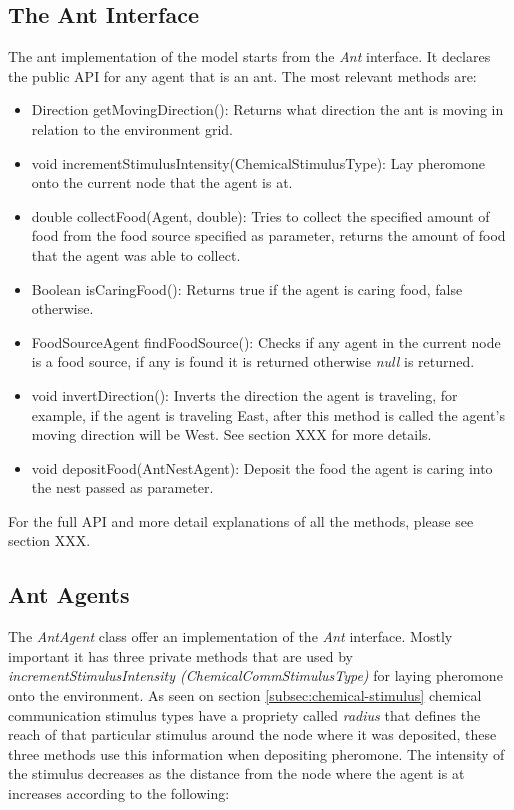 \subsection{The Ant Interface}

The ant implementation of the model starts from the \emph{Ant} interface. It declares the public API for any agent that is an ant. The most relevant methods are: 

\begin{itemize}
  \item Direction getMovingDirection(): Returns what direction the ant is moving in relation to the environment grid.
  \item void incrementStimulusIntensity(ChemicalStimulusType): Lay pheromone onto the current node that the agent is at.
  \item double collectFood(Agent, double): Tries to collect the specified amount of food from the food source specified as parameter, returns the amount of food that the agent was able to collect.
  \item Boolean isCaringFood(): Returns true if the agent is caring food, false otherwise.
  \item FoodSourceAgent findFoodSource(): Checks if any agent in the current node is a food source, if any is found it is returned otherwise \emph{null} is returned.
  \item void invertDirection(): Inverts the direction the agent is traveling, for example, if the agent is traveling East, after this method is called the agent’s moving direction will be West. See section XXX for more details.
  \item void depositFood(AntNestAgent): Deposit the food the agent is caring into the nest passed as parameter.
\end{itemize}

For the full API and more detail explanations of all the methods, please see section XXX.

\subsection{Ant Agents}

The \emph{AntAgent} class offer an implementation of the \emph{Ant} interface. Mostly important it has three private methods that are used by \emph{incrementStimulusIntensity (ChemicalCommStimulusType)} for laying pheromone onto the environment. As seen on section \ref{subsec:chemical-stimulus} chemical communication stimulus types have a propriety called \emph{radius} that defines the reach of that particular stimulus around the node where it was deposited, these three methods use this information when depositing pheromone. The intensity of the stimulus decreases as the distance from the node where the agent is at increases according to the following: 

